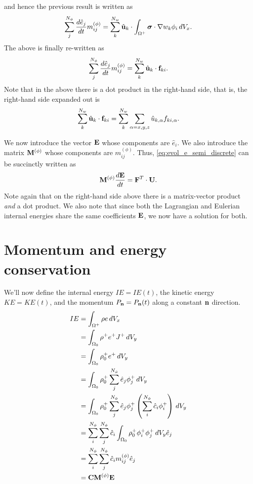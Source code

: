 \documentclass[11pt]{article}
\begin{document}
and hence the previous result is written as
\begin{equation}
    \sum_j^{N_\phi} \frac{d \hat{e}_j}{dt} m_{ij}^{(\phi)} = \sum_k^{N_w} \hat{\mathbf{u}}_k \cdot \int_{\Omega^+} \bm \sigma \cdot \nabla w_k \phi_i \, dV_x.
\end{equation}
The above is finally re-written as
\begin{equation}
    \label{eq:evol_e_semi_discrete}
    \sum_j^{N_\phi} \frac{d \hat{e}_j}{d t} m^{(\phi)}_{ij} = \sum_k^{N_w} \hat{\mathbf{u}}_k \cdot \mathbf{f}_{ki}.
\end{equation}
Note that in the above there is a dot product in the right-hand side, that is, the right-hand side expanded out is  
\begin{equation}
    \sum_k^{N_w} \hat{\mathbf{u}}_k \cdot \mathbf{f}_{ki} = \sum_k^{N_w} \sum_{\alpha=x,y,z} \hat{u}_{k,\alpha} f_{ki,\alpha}.
\end{equation}

We now introduce the vector $\mathbf{E}$ whose components are $\hat{e}_i$. We also introduce the matrix $\mathbf{M}^{(\phi)}$ whose components are $m_{ij}^{(\phi)}$. Thus, \cref{eq:evol_e_semi_discrete} can be succinctly written as
\begin{equation}
    \mathbf{M}^{(\phi)} \frac{d\mathbf{E}}{dt} = \mathbf{F}^T \cdot \mathbf{U}.
\end{equation}
Note again that on the right-hand side above there is a matrix-vector product \textit{and} a dot product. We also note that since both the Lagrangian and Eulerian internal energies share the same coefficients $\mathbf{E}$, we now have a solution for both.

\section{Momentum and energy conservation}
We'll now define the internal energy $IE=IE(t)$, the kinetic energy $KE=KE(t)$, and the momentum $P_{\mathbf{n}}=P_{\mathbf{n}}(t)$ along a constant $\mathbf{n}$ direction.
\begin{align}
    IE &= \int_{\Omega^+} \rho e \, dV_x \nonumber \\
    &= \int_{\Omega_0} \rho^+ e^+ J^+ \, dV_y \nonumber \\
    &= \int_{\Omega_0} \rho^+_0 e^+ \, dV_y \nonumber \\
    &= \int_{\Omega_0} \rho_0^+ \sum_{j}^{N_\phi} \hat{e}_j \phi_j^+ \, dV_y \nonumber \\
    &= \int_{\Omega_0} \rho_0^+ \sum_{j}^{N_\phi} \hat{e}_j \phi_j^+ \left ( \sum_{i}^{N_\phi} \hat{c}_i \phi^+_i \right ) \, dV_y \nonumber \\
    &= \sum_i^{N_\phi} \sum_j^{N_\phi} \hat{c}_i \int_{\Omega_0} \rho_0^+ \phi_i^+ \phi_j^+ \, dV_y \hat{e}_j \nonumber \\
    &= \sum_i^{N_\phi} \sum_j^{N_\phi} \hat{c}_i m_{ij}^{(\phi)} \hat{e}_j \nonumber \\
    &= \mathbf{C} \mathbf{M}^{(\phi)} \mathbf{E} 
\end{align}
\end{document}

